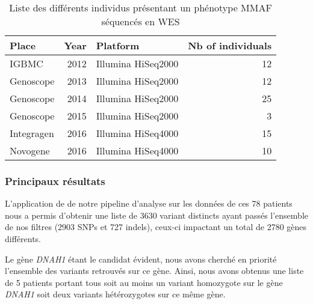 \documentclass[12pt,twoside]{ugathesis}
\begin{document}
\begin{longtable}[t]{lrlr}
\caption{\label{tab:tabrunbigmmaf}Liste des différents individus présentant un phénotype MMAF séquencés en WES}\\
\toprule
Place & Year & Platform & Nb of individuals\\
\midrule
IGBMC & 2012 & Illumina HiSeq2000 & 12\\
Genoscope & 2013 & Illumina HiSeq2000 & 12\\
Genoscope & 2014 & Illumina HiSeq2000 & 25\\
Genoscope & 2015 & Illumina HiSeq2000 & 3\\
Integragen & 2016 & Illumina HiSeq4000 & 15\\
Novogene & 2016 & Illumina HiSeq4000 & 10\\
\bottomrule
\end{longtable}



\newpage

\subsubsection{Principaux résultats}\label{principaux-resultats-4}

L'application de de notre pipeline d'analyse sur les données de ces 78
patients nous a permis d'obtenir une liste de 3630 variant distincts
ayant passés l'ensemble de nos filtres (2903 SNPs et 727 indels),
ceux-ci impactant un total de 2780 gènes différents.

Le gène \emph{DNAH1} étant le candidat évident, nous avons cherché en
priorité l'ensemble des variants retrouvés sur ce gène. Ainsi, nous
avons obtenus une liste de 5 patients portant tous soit au moins un
variant homozygote sur le gène \emph{DNAH1} soit deux variants
hétérozygotes sur ce même gène.
\end{document}
